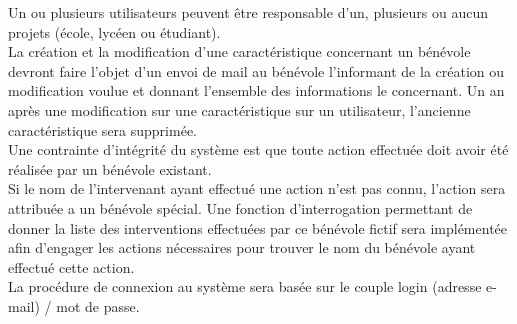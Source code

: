 Un ou plusieurs utilisateurs peuvent être responsable d'un, plusieurs ou aucun projets (école, lycéen ou étudiant).\\

La création et la modification d'une caractéristique concernant un bénévole devront faire l'objet d'un envoi de mail au bénévole l'informant de la création ou modification voulue et donnant l'ensemble des informations le concernant. Un an après une modification sur une caractéristique sur un utilisateur, l'ancienne caractéristique sera supprimée. \\


Une contrainte d'intégrité du système est que toute action effectuée doit avoir été réalisée par un bénévole existant. \\
Si le nom de l'intervenant ayant effectué une action n'est pas connu, l'action sera attribuée a un bénévole spécial. Une fonction d'interrogation permettant de donner la liste des interventions effectuées par ce bénévole fictif sera implémentée afin d'engager les actions nécessaires pour trouver le nom du bénévole ayant effectué cette action. \\


La procédure de connexion au système sera basée sur le couple login (adresse e-mail) / mot de passe.
